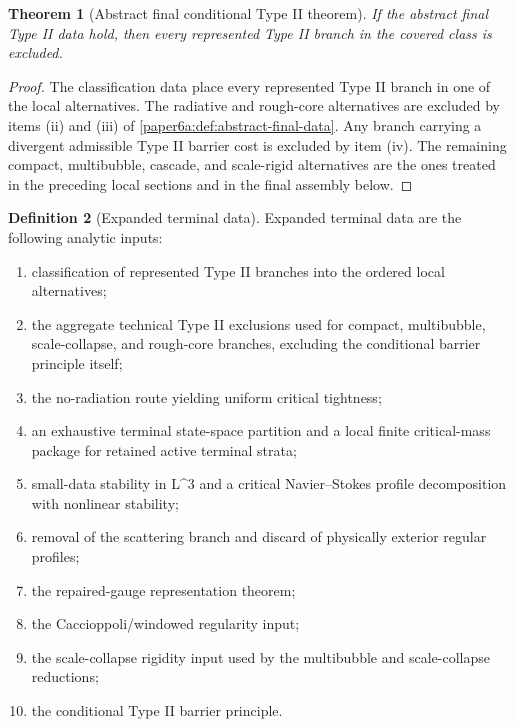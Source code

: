 \documentclass[11pt]{amsart}
\def\({}%
\def\){}%
\theoremstyle{plain}
\newtheorem{theorem}{Theorem}[section]
\theoremstyle{definition}
\newtheorem{definition}[theorem]{Definition}
\theoremstyle{remark}
\begin{document}
\begin{theorem}[Abstract final conditional Type II theorem]
\label{paper6a:thm:abstract-final-typeII}
If the abstract final Type II data hold, then every represented Type II branch
in the covered class is excluded.
\end{theorem}

\begin{proof}
The classification data place every represented Type II branch in one of the
local alternatives.  The radiative and rough-core alternatives are excluded by
items \textup{(ii)} and \textup{(iii)} of
\cref{paper6a:def:abstract-final-data}.  Any branch carrying a divergent
admissible Type II barrier cost is excluded by item \textup{(iv)}.  The
remaining compact, multibubble, cascade, and scale-rigid alternatives are the
ones treated in the preceding local sections and in the final assembly below.
\end{proof}

\begin{definition}[Expanded terminal data]\label{paper6a:def:expanded-terminal-data}
Expanded terminal data are the following analytic inputs:
\begin{enumerate}[label=\textup{(\roman*)}]
\item classification of represented Type II branches into the ordered local
alternatives;
\item the aggregate technical Type II exclusions used for compact,
multibubble, scale-collapse, and rough-core branches, excluding the conditional
barrier principle itself;
\item the no-radiation route yielding uniform critical tightness;
\item an exhaustive terminal state-space partition and a local finite
critical-mass package for retained active terminal strata;
\item small-data stability in \(L^3\) and a critical Navier--Stokes profile
decomposition with nonlinear stability;
\item removal of the scattering branch and discard of physically exterior
regular profiles;
\item the repaired-gauge representation theorem;
\item the Caccioppoli/windowed regularity input;
\item the scale-collapse rigidity input used by the multibubble and
scale-collapse reductions;
\item the conditional Type II barrier principle.
\end{enumerate}
\end{definition}
\end{document}
